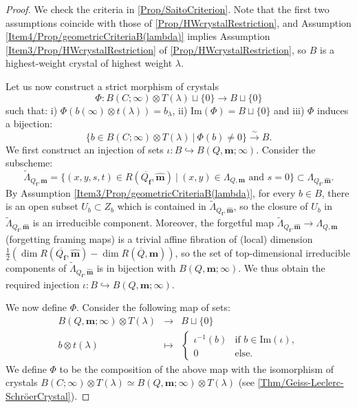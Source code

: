\documentclass[a4paper,12pt]{article}
\theoremstyle{definition}
\theoremstyle{plain}
\theoremstyle{remark}
\newcommand\bff{\mathbf{f}}
\newcommand\bfm{\mathbf{m}}
\begin{document}
\begin{proof}
We check the criteria in \cref{Prop/SaitoCriterion}. Note that the first two assumptions coincide with those of \cref{Prop/HWcrystalRestriction}, and Assumption \ref{Item4/Prop/geometricCriteriaB(lambda)} implies Assumption \ref{Item3/Prop/HWcrystalRestriction} of \cref{Prop/HWcrystalRestriction}, so $B$ is a highest-weight crystal of highest weight $\lambda$.

Let us now construct a strict morphism of crystals
\[
\Phi: B(C;\infty)\otimes T(\lambda)\sqcup\{0\}\rightarrow B\sqcup\{0\}
\]
such that: i) $\Phi(b(\infty)\otimes t(\lambda))=b_\lambda$, ii) $\mathrm{Im}(\Phi)=B\sqcup\{0\}$ and iii) $\Phi$ induces a bijection:
\[
\{b\in B(C;\infty)\otimes T(\lambda)\ \vert\ \Phi(b)\ne0\}\overset{\sim}{\rightarrow} B.
\]
We first construct an injection of sets $\iota:B\hookrightarrow B(Q,\bfm;\infty)$. Consider the subscheme:
\begin{equation}\label{Def/Lambdatilde}    
\tilde{\Lambda}_{Q_\bff,\widehat{\bfm}}=\{ (x,y,s,t)\in R(\overline{Q_\bff},\widehat{\bfm})\ \vert\ (x,y)\in\Lambda_{Q,\bfm}\text{ and } s=0\}
\subset
\Lambda_{Q_\bff,\widehat{\bfm}}
.
\end{equation}
By Assumption  \ref{Item3/Prop/geometricCriteriaB(lambda)}, for every $b\in B$, there is an open subset $U_b\subset Z_b$ which is contained in $\tilde{\Lambda}_{Q_\bff,\widehat{\bfm}}$, so the closure of $U_b$ in $\tilde{\Lambda}_{Q_\bff,\widehat{\bfm}}$ is an irreducible component. Moreover, the forgetful map $\tilde{\Lambda}_{Q_\bff,\widehat{\bfm}}\rightarrow\Lambda_{Q,\bfm}$ (forgetting framing maps) is a trivial affine fibration of (local) dimension $\frac{1}{2}(\dim R(\overline{Q_\bff},\widehat{\bfm})-\dim R(\overline{Q},\bfm))$, so the set of top-dimensional irreducible components of $\tilde{\Lambda}_{Q_\bff,\widehat{\bfm}}$ is in bijection with $B(Q,\bfm;\infty)$. We thus obtain the required injection $\iota:B\hookrightarrow B(Q,\bfm;\infty)$.

We now define $\Phi$. Consider the following map of sets:
\[
\begin{array}{rcl}
B(Q,\bfm;\infty)\otimes T(\lambda) & \rightarrow & B\sqcup\{0\} \\
b\otimes t(\lambda) & \mapsto &
\left\{
\begin{array}{ll}
\iota^{-1}(b) & \text{if } b\in\mathrm{Im}(\iota), \\
0 & \text{else.}
\end{array}
\right.
\end{array}
\]
We define $\Phi$ to be the composition of the above map with the isomorphism of crystals $B(C;\infty)\otimes T(\lambda)\simeq B(Q,\bfm;\infty)\otimes T(\lambda)$ (see \cref{Thm/Geiss-Leclerc-SchröerCrystal}).


\end{proof}
\end{document}

